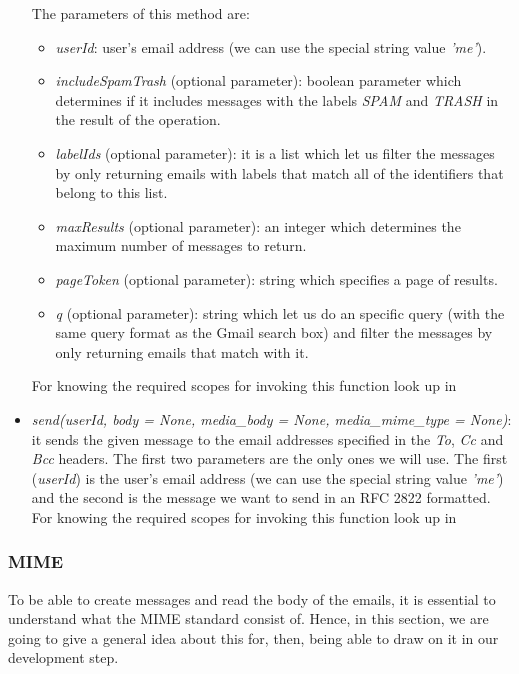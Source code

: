 \begin{itemize}
	The parameters of this method are:
	\begin{itemize}
		\item\textit{userId}: user's email address (we can use the special string value \textit{'me'}).
		\item\textit{includeSpamTrash} (optional parameter): boolean parameter which determines if it includes messages with the labels \textit{SPAM} and \textit{TRASH} in the result of the operation.
		\item\textit{labelIds} (optional parameter): it is a list which let us filter the messages by only returning emails with labels that match all of the identifiers that belong to this list.
		\item\textit{maxResults} (optional parameter): an integer which determines the maximum number of messages to return.
		\item\textit{pageToken} (optional parameter): string which specifies a page of results.
		\item\textit{q} (optional parameter): string which let us do an specific query (with the same query format as the Gmail search box) and filter the messages by only returning emails that match with it.
	\end{itemize}
	For knowing the required scopes for invoking this function look up in \cite[/v1/reference/users/messages/list]{gmailAPI}
	\item\textit{send(userId, body = None, media\_body = None, media\_mime\_type = None)}: it sends the given message to the email addresses specified in the \textit{To}, \textit{Cc} and \textit{Bcc} headers. The first two parameters are the only ones we will use. The first (\textit{userId}) is the user's email address (we can use the special string value \textit{'me'}) and the second is the message we want to send in an RFC 2822 \citep{rfc2822} formatted. For knowing the required scopes for invoking this function look up in \cite[/v1/reference/users/messages/send]{gmailAPI}
\end{itemize}

\subsubsection{MIME} \label{sssect:mime}
To be able to create messages and read the body of the emails, it is essential to understand what the MIME standard consist of. Hence, in this section, we are going to give a general idea about this for, then, being able to draw on it in our development step.

